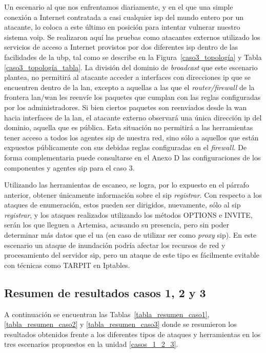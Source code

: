 \documentclass[a4paper,12pt]{report}
\begin{document}
\pagebreak

Un escenario al que nos enfrentamos diariamente, y en el que una simple conexión
a Internet contratada a casi cualquier \ac{isp} del mundo entero por un atacante, lo
coloca a este último en posición para intentar vulnerar nuestro sistema \ac{voip}.
Se realizaron aquí las pruebas como atacantes externos utilizado los servicios de
acceso a Internet provistos por dos diferentes \ac{isp} dentro de las facilidades de la 
\ac{ubp}, tal como se describe en la Figura~\ref{caso3_topología} y Tabla \ref{caso3_topología_tabla}.
 La división del dominio de \emph{broadcast} que este escenario plantea, no permitirá
 al atacante acceder a interfaces con direcciones \ac{ip} que se encuentren dentro de
la \ac{lan}, excepto a aquellas a las que el \emph{router/firewall} de la frontera
\ac{lan}/\ac{wan} les reenvíe los paquetes que cumplan con las reglas configuradas por los
administradores. Si bien ciertos paquetes son reenviados desde la \ac{wan} hacia
interfaces de la \ac{lan}, el atacante externo observará una única dirección \ac{ip} del
dominio, aquella que es pública. Esta situación no permitirá a las herramientas
tener acceso a todos los agentes \ac{sip} de nuestra red, sino sólo a aquellos que
están expuestos públicamente con sus debidas reglas configuradas en el
\emph{firewall}. De forma complementaria puede consultarse en el Anexo D
las configuraciones de los componentes y agentes \ac{sip} para el caso 3.

Utilizando las herramientas de escaneo, se logra, por lo expuesto en el párrafo 
anterior, obtener únicamente información sobre el \ac{sip} \emph{registrar}.
Con respecto a los ataques de enumeración, estos pueden ser dirigidos, 
nuevamente, sólo al \ac{sip} \emph{registrar}, y los ataques realizados utilizando
los métodos OPTIONS e INVITE, serán los que lleguen a Artemisa, acusando su
presencia, pero sin poder determinar más datos que el \ac{ua} (en caso
de utilizar \ac{ser} como \emph{proxy} \ac{sip}).
En este escenario un ataque de inundación podría afectar los recursos de red y 
procesamiento del servidor \ac{sip}, pero un ataque de este tipo es fácilmente
evitable con técnicas como TARPIT en Iptables.

\subsection{Resumen de resultados casos 1, 2 y 3}

A continuación se encuentran las Tablas~\ref{tabla_resumen_caso1}, \ref{tabla_resumen_caso2}
y \ref{tabla_resumen_caso3} donde se resumieron los resultados obtenidos frente a los diferentes 
tipos de ataques y herramientas en los tres escenarios propuestos en la unidad \ref{casos_1_2_3}.
\end{document}
